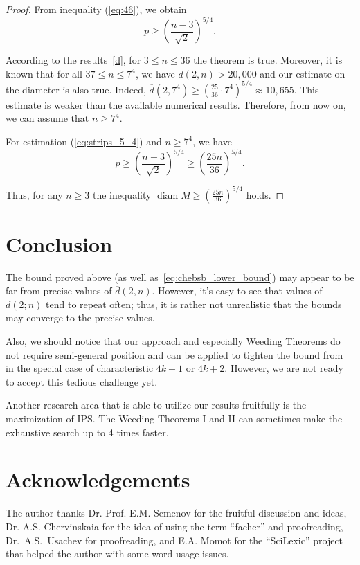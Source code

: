 \documentclass[a4paper,14pt]{article} %
\theoremstyle{plain}
\theoremstyle{definition}
\begin{document}
\begin{proof}
	From inequality (\ref{eq:46}), we obtain
	\begin{equation}
		\label{eq:strips_5_4}
		p \geq \left( \frac{n -3}{\sqrt{2}} \right)^{5/4}
		.
	\end{equation}

	According to the results~\eqref{d}, for $3 \leq n \leq 36$ the theorem is true.
	Moreover, it is known that for all $37 \leq n \leq 7^4$, we have $\overline{d}(2, n) > 20,000$ and our estimate on the diameter is also true.
	Indeed, $\overline{d}(2, 7^4) \geq \left(\frac{25}{36}\cdot 7^4\right)^{5/4} \approx 10,655$.
	This estimate is weaker than the available numerical results. Therefore, from now on, we can assume that $n \geq 7^4$.

	For estimation (\ref{eq:strips_5_4}) and $n \geq 7^4$, we have
	\begin{equation}
		\label{eq:strips_5_4_7}
		p \geq \left( \frac{n -3}{\sqrt{2}} \right)^{5/4}  \geq \left( \frac{25n}{36} \right)^{5/4}
		.
	\end{equation}

	Thus, for any $n \geq 3$ the inequality $
		\operatorname{diam} M \geq \left( \frac{25n}{36} \right)^{5/4}
	$ holds.
\end{proof}



\section{Conclusion}
	The bound proved above (as well as~\eqref{eq:chebsb_lower_bound}) may appear to be far from precise values of $\overline{d}(2,n)$.
	However, it's easy to see that values of $d(2;n)$ tend to repeat often;
	thus, it is rather not unrealistic that the bounds may converge to the precise values.

	Also, we should notice that our approach and especially Weeding Theorems do not require semi-general position and can be applied to tighten the bound from~\cite{my-pps-linear-bound-2019}
	in the special case of characteristic $4k+1$ or $4k+2$.
	However, we are not ready to accept this tedious challenge yet.

	Another research area that is able to utilize our results fruitfully is the maximization of IPS.
	The Weeding Theorems I and II can sometimes make the exhaustive search up to 4 times faster.




\section{Acknowledgements}
The author thanks Dr. Prof. E.M. Semenov for the fruitful discussion and ideas,
Dr. A.S. Chervinskaia for the idea of using the term ``facher'' and proofreading,
Dr.~A.S.~Usachev for proofreading,
and E.A. Momot for the ``SciLexic'' project that helped the author with some word usage issues.


\printbibliography
\end{document}
